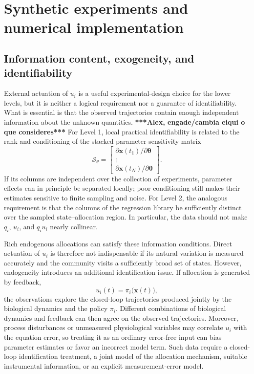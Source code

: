 \documentclass[11pt,a4paper]{article}
\newcommand{\vect}[1]{\boldsymbol{#1}}
\begin{document}
\section{Synthetic experiments and numerical implementation}

\subsection{Information content, exogeneity, and identifiability}

External actuation of \(u_i\) is a useful experimental-design choice for the
lower levels, but it is neither a logical requirement nor a guarantee of
identifiability. What is essential is that the observed trajectories contain
enough independent information about the unknown quantities. \textbf{***Alex, engade/cambia eiqui o que consideres***} For Level 1,
local practical identifiability is related to the rank and conditioning of
the stacked parameter-sensitivity matrix
\begin{equation}
  \mathcal{S}_{\theta} =
  \begin{bmatrix}
    \partial\vect{x}(t_1)/\partial\vect{\theta}\\
    \vdots\\
    \partial\vect{x}(t_N)/\partial\vect{\theta}
  \end{bmatrix}.
\end{equation}
If its columns are independent over the collection of experiments, parameter
effects can in principle be separated locally; poor conditioning still makes
their estimates sensitive to finite sampling and noise. For Level 2, the
analogous requirement is that the columns of the regression library be
sufficiently distinct over the sampled state--allocation region. In
particular, the data should not make \(q_i\), \(u_i\), and \(q_i u_i\) nearly
collinear.

Rich endogenous allocations can satisfy these information conditions. Direct
actuation of \(u_i\) is therefore not indispensable if its natural variation
is measured accurately and the community visits a sufficiently broad set of
states. However, endogeneity introduces an additional identification issue.
If allocation is generated by feedback,
\begin{equation}
  u_i(t)=\pi_i\bigl(\vect{x}(t)\bigr),
\end{equation}
the observations explore the closed-loop trajectories produced jointly by
the biological dynamics and the policy \(\pi_i\). Different combinations of
biological dynamics and feedback can then agree on the observed trajectories.
Moreover, process disturbances or unmeasured physiological variables may
correlate \(u_i\) with the equation error, so treating it as an ordinary
error-free input can bias parameter estimates or favor an incorrect model
term. Such data require a closed-loop identification treatment, a joint model
of the allocation mechanism, suitable instrumental information, or an
explicit measurement-error model.
\end{document}
